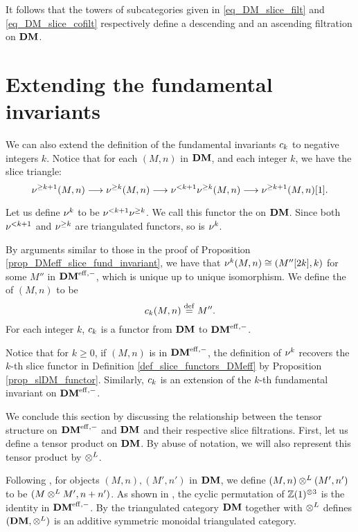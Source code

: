It follows that the towers of subcategories given in 
\eqref{eq_DM_slice_filt} and \eqref{eq_DM_slice_cofilt} 
respectively define a descending and an ascending filtration on 
$\mathbf{DM}$.

\section{Extending the fundamental invariants}

We can also extend the definition of the fundamental invariants
$c_{k}$ to negative integers $k$. Notice that for each $(M, n)$
in $\mathbf{DM}$, and each integer $k$, we have the slice triangle:
\[
\nu^{\geq k + 1}(M, n) \longrightarrow \nu^{\geq k}(M, n) \longrightarrow \nu^{< k + 1}\nu^{\geq k}(M, n)
\longrightarrow \nu^{\geq k + 1}(M, n)[1].
\]

\begin{defn}
Let us define $\nu^{k}$ to be $\nu^{< k + 1}\nu^{\geq k}$. We call
this functor the  on $\mathbf{DM}$. Since both 
$\nu^{< k + 1}$ and $\nu^{\geq k}$ are triangulated functors, so is 
$\nu^{k}$.

By arguments similar to those in the proof of Proposition
\ref{prop_DMeff_slice_fund_invariant}, we have that 
$\nu^{k}(M, n) \cong (M''[2k], k)$ for some $M''$ in $\mathbf{DM}^{\mathrm{eff},-}$,
which is unique up to unique isomorphism. We 
define the  of $(M, n)$ to be
\[
c_{k}(M, n) \stackrel{\mathrm{def}}{=} M''.
\]
For each integer $k$, $c_{k}$ is a functor from $\mathbf{DM}$ to
$\mathbf{DM}^{\mathrm{eff},-}$.

Notice that for $k \geq 0$, if $(M, n)$ is in $\mathbf{DM}^{\mathrm{eff},-}$, the definition
of $\nu^{k}$ recovers the $k$-th slice functor in Definition
\ref{def_slice_functors_DMeff} by Proposition
\ref{prop_slDM_functor}. Similarly, $c_{k}$ is an extension of the
$k$-th fundamental invariant on $\mathbf{DM}^{\mathrm{eff},-}$.
\end{defn}

We conclude this section by discussing the relationship between the
tensor structure on $\mathbf{DM}^{\mathrm{eff},-}$ and $\mathbf{DM}$ and their respective slice
filtrations. First, let us define a tensor product on $\mathbf{DM}$. By 
abuse of notation, we will also represent this tensor product by 
$\otimes^L$.

\begin{defn}\label{def_tensor_DM}
Following \cite[8A]{MVW}, for objects $(M, n), (M', n')$ in $\mathbf{DM}$, we 
define $(M, n) \otimes^L (M', n')$ to be $(M \otimes^L M', n + n')$. As 
shown in \cite[15.8]{MVW}, the cyclic permutation of 
$\mathbb{Z}(1)^{\otimes 3}$ is the identity in $\mathbf{DM}^{\mathrm{eff},-}$. By 
\cite[8A.12]{MVW} the triangulated category $\mathbf{DM}$ together with 
$\otimes^L$ defines $(\mathbf{DM}, \otimes^L)$ is an additive symmetric monoidal 
triangulated category. 
\end{defn}

